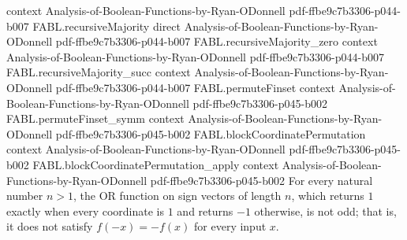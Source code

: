 \begin{theorem}
  {context}
  {Analysis-of-Boolean-Functions-by-Ryan-ODonnell}
  {pdf-ffbe9c7b3306-p044-b007}
\proofstep
  {FABL.recursiveMajority}
  {direct}
  {Analysis-of-Boolean-Functions-by-Ryan-ODonnell}
  {pdf-ffbe9c7b3306-p044-b007}
\proofstep
  {FABL.recursiveMajority_zero}
  {context}
  {Analysis-of-Boolean-Functions-by-Ryan-ODonnell}
  {pdf-ffbe9c7b3306-p044-b007}
\proofstep
  {FABL.recursiveMajority_succ}
  {context}
  {Analysis-of-Boolean-Functions-by-Ryan-ODonnell}
  {pdf-ffbe9c7b3306-p044-b007}
\proofstep
  {FABL.permuteFinset}
  {context}
  {Analysis-of-Boolean-Functions-by-Ryan-ODonnell}
  {pdf-ffbe9c7b3306-p045-b002}
\proofstep
  {FABL.permuteFinset_symm}
  {context}
  {Analysis-of-Boolean-Functions-by-Ryan-ODonnell}
  {pdf-ffbe9c7b3306-p045-b002}
\proofstep
  {FABL.blockCoordinatePermutation}
  {context}
  {Analysis-of-Boolean-Functions-by-Ryan-ODonnell}
  {pdf-ffbe9c7b3306-p045-b002}
\proofstep
  {FABL.blockCoordinatePermutation_apply}
  {context}
  {Analysis-of-Boolean-Functions-by-Ryan-ODonnell}
  {pdf-ffbe9c7b3306-p045-b002}
For every natural number $n>1$, the OR function on sign vectors of length $n$, which
returns $1$ exactly when every coordinate is $1$ and returns $-1$ otherwise, is not odd;
that is, it does not satisfy $f(-x)=-f(x)$ for every input $x$.
\end{theorem}

